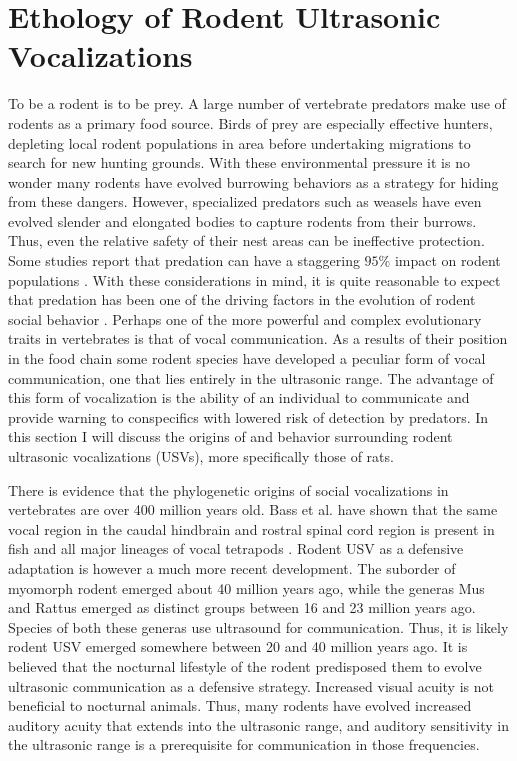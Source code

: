 \documentclass[12pt, letter]{report}
\begin{document}
\section{Ethology of Rodent Ultrasonic Vocalizations}
To be a rodent is to be prey. A large number of vertebrate predators make use of rodents as a primary food source. Birds of prey are especially effective hunters, depleting local rodent populations in area before undertaking migrations to search for new hunting grounds. With these environmental pressure it is no wonder many rodents have evolved burrowing behaviors as a strategy for hiding from these dangers. However, specialized predators such as weasels have even evolved slender and elongated bodies to capture rodents from their burrows. Thus, even the relative safety of their nest areas can be ineffective protection. Some studies report that predation can have a staggering $95 \%$ impact on rodent populations \cite{Jedrzejewski1993}. With these considerations in mind, it is quite reasonable to expect that predation has been one of the driving factors in the evolution of rodent social behavior \cite{Brudzynski2010}. Perhaps one of the more powerful and complex evolutionary traits in vertebrates is that of vocal communication. As a results of their position in the food chain some rodent species have developed a peculiar form of vocal communication, one that lies entirely in the ultrasonic range. The advantage of this form of vocalization is the ability of an individual to communicate and provide warning to conspecifics with lowered risk of detection by predators. In this section I will discuss the origins of and behavior surrounding rodent ultrasonic vocalizations (USVs), more specifically those of rats. 

There is evidence that the phylogenetic origins of social vocalizations in vertebrates are over 400 million years old. Bass et al. have shown that the same vocal region in the caudal hindbrain and rostral spinal cord region is present in fish and all major lineages of vocal tetrapods \cite{Bass2008}. Rodent USV as a defensive adaptation is however a much more recent development. The suborder of myomorph rodent emerged about 40 million years ago, while the generas Mus and Rattus emerged as distinct groups between 16 and 23 million years ago. Species of both these generas use ultrasound for communication. Thus, it is likely rodent USV emerged somewhere between 20 and 40 million years ago. It is believed that the nocturnal lifestyle of the rodent predisposed them to evolve ultrasonic communication as a defensive strategy. Increased visual acuity is not beneficial to nocturnal animals. Thus, many rodents have evolved increased auditory acuity that extends into the ultrasonic range, and auditory sensitivity in the ultrasonic range is a prerequisite for communication in those frequencies.
\end{document}
